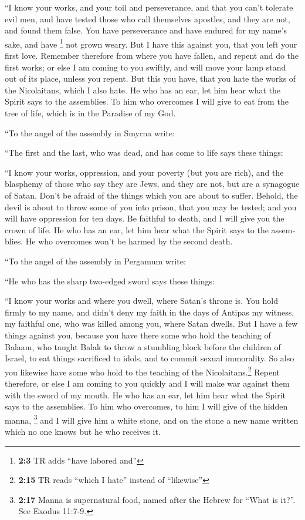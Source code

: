 \begin{paracol}{2}
\begin{otherlanguage}{english}
 ``I know your works, and your toil and perseverance, and
that you can't tolerate evil men, and have tested those who call
themselves apostles, and they are not, and found them false.
 You have perseverance and have endured for my name's
sake, and have \footnote{\textbf{2:3} TR adds ``have labored and''} not
grown weary.  But I have this against you, that you left
your first love.  Remember therefore from where you have
fallen, and repent and do the first works; or else I am coming to you
swiftly, and will move your lamp stand out of its place, unless you
repent.  But this you have, that you hate the works of the
Nicolaitans, which I also hate.  He who has an ear, let
him hear what the Spirit says to the assemblies. To him who overcomes I
will give to eat from the tree of life, which is in the Paradise of my
God.

 ``To the angel of the assembly in Smyrna write:

``The first and the last, who was dead, and has come to life says these
things:

 ``I know your works, oppression, and your poverty (but
you are rich), and the blasphemy of those who say they are Jews, and
they are not, but are a synagogue of Satan.  Don't be
afraid of the things which you are about to suffer. Behold, the devil is
about to throw some of you into prison, that you may be tested; and you
will have oppression for ten days. Be faithful to death, and I will give
you the crown of life.  He who has an ear, let him hear
what the Spirit says to the assemblies. He who overcomes won't be harmed
by the second death.

 ``To the angel of the assembly in Pergamum write:

``He who has the sharp two-edged sword says these things:

 ``I know your works and where you dwell, where Satan's
throne is. You hold firmly to my name, and didn't deny my faith in the
days of Antipas my witness, my faithful one, who was killed among you,
where Satan dwells.  But I have a few things against you,
because you have there some who hold the teaching of Balaam, who taught
Balak to throw a stumbling block before the children of Israel, to eat
things sacrificed to idols, and to commit sexual immorality.
 So also you likewise have some who hold to the teaching
of the Nicolaitans.\footnote{\textbf{2:15} TR reads ``which I hate''
  instead of ``likewise''}  Repent therefore, or else I
am coming to you quickly and I will make war against them with the sword
of my mouth.  He who has an ear, let him hear what the
Spirit says to the assemblies. To him who overcomes, to him I will give
of the hidden manna, \footnote{\textbf{2:17} Manna is supernatural food,
  named after the Hebrew for ``What is it?''. See Exodus 11:7-9.} and I
will give him a white stone, and on the stone a new name written which
no one knows but he who receives it.


\end{otherlanguage}
\end{paracol}
